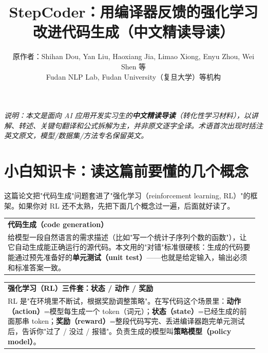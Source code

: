 \documentclass[11pt,UTF8,fontset=fandol]{ctexart}
\title{\textbf{StepCoder：用编译器反馈的强化学习改进代码生成（中文精读导读）}}
\author{原作者：Shihan Dou, Yan Liu, Haoxiang Jia, Limao Xiong, Enyu Zhou, Wei Shen 等\\
Fudan NLP Lab, Fudan University（复旦大学）等机构}
\date{}
\makeatletter
\newenvironment{infobox}[1]{%
  \par\medskip\noindent
  \begin{tabular}{@{}p{0.97\linewidth}@{}}
  \hline
  \rule{0pt}{2.4ex}\textbf{#1}\\
}{%
  \\\hline
  \end{tabular}\par\medskip
}
\makeatother
\begin{document}
\maketitle

\begin{center}
\end{center}

\noindent\textit{说明：本文是面向 AI 应用开发实习生的\textbf{中文精读导读}（转化性学习材料），以讲解、转述、关键句翻译和公式拆解为主，并非原文逐字全译。术语首次出现时括注英文原文，模型/数据集/方法专名保留英文。}

\section{小白知识卡：读这篇前要懂的几个概念}

这篇论文把"代码生成"问题套进了"强化学习（reinforcement learning, RL）"的框架。如果你对 RL 还不太熟，先把下面几个概念过一遍，后面就好读了。

\begin{infobox}{代码生成（code generation）}
给模型一段自然语言的需求描述（比如"写一个统计子序列个数的函数"），让它自动生成能正确运行的源代码。本文用的"对错"标准很硬核：生成的代码要能通过预先准备好的\textbf{单元测试（unit test）}——也就是给定输入，输出必须和标准答案一致。
\end{infobox}

\begin{infobox}{强化学习（RL）三件套：状态 / 动作 / 奖励}
RL 是"在环境里不断试，根据奖励调整策略"。在写代码这个场景里：\textbf{动作（action）}=模型每生成一个 token（词元）；\textbf{状态（state）}=已经生成的前面那串 token；\textbf{奖励（reward）}=整段代码写完、丢进编译器跑完单元测试后，告诉你"过了 / 没过 / 报错"。负责生成的模型叫\textbf{策略模型（policy model）}。
\end{infobox}
\end{document}
